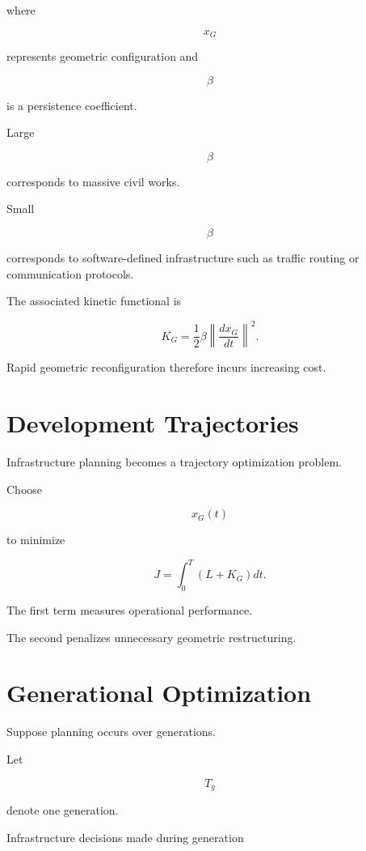 \documentclass[11pt,fleqn]{book}
\numberwithin{equation}{chapter}
\theoremstyle{plain}
\theoremstyle{definition}
\theoremstyle{remark}
\begin{document}
where

\[
x_G
\]

represents geometric configuration and

\[
\beta
\]

is a persistence coefficient.

Large

\[
\beta
\]

corresponds to massive civil works.

Small

\[
\beta
\]

corresponds to software-defined infrastructure such as traffic routing
or communication protocols.


The associated kinetic functional is

\[
K_G
=
\frac12
\beta
\left\|
\frac{dx_G}{dt}
\right\|^2.
\]

Rapid geometric reconfiguration therefore incurs increasing cost.


\section{Development Trajectories}

Infrastructure planning becomes a trajectory optimization problem.

Choose

\[
x_G(t)
\]

to minimize

\[
\boxed{
J
=
\int_0^T
\left(
L
+
K_G
\right)
dt.
}
\]

The first term measures operational performance.

The second penalizes unnecessary geometric restructuring.


\section{Generational Optimization}

Suppose planning occurs over generations.

Let

\[
T_g
\]

denote one generation.

Infrastructure decisions made during generation
\end{document}
